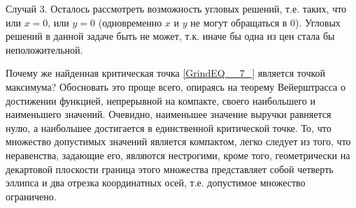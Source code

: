 \begin{problem}
\begin{sol}
Случай 3. Осталось рассмотреть возможность угловых решений, т.е. таких, что или $x=0$, или $y=0$ (одновременно $x$ и $y$ не могут обращаться в 0). Угловых решений в данной задаче быть не может, т.к. иначе бы одна из цен стала бы неположительной.

Почему же найденная критическая точка \ref{GrindEQ__7_} является точкой максимума? Обосновать это проще всего, опираясь на теорему Вейерштрасса о достижении функцией, непрерывной на компакте, своего наибольшего и наименьшего значений. Очевидно, наименьшее значение выручки равняется нулю, а наибольшее достигается в единственной критической точке. То, что множество допустимых значений является компактом, легко следует из того, что неравенства, задающие его, являются нестрогими, кроме того, геометрически на декартовой плоскости граница этого множества представляет собой четверть эллипса и два отрезка координатных осей, т.е. допустимое множество ограничено.
\end{sol}
\end{problem}


